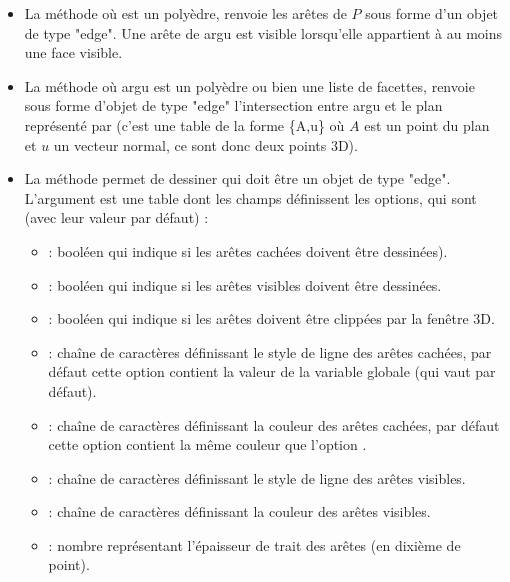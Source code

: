 \begin{itemize}
    \item La méthode  où  est un polyèdre, renvoie les arêtes de $P$ sous forme d'un objet de type "edge". Une arête de argu est visible lorsqu'elle appartient à au moins une face visible.
    
    \item La méthode  où argu est un polyèdre ou bien une liste de facettes, renvoie sous forme d'objet de type "edge" l'intersection entre argu et le plan représenté par  (c'est une table de la forme \{A,u\} où $A$ est un point du plan et $u$ un vecteur normal, ce sont donc deux points 3D).
    
    \item La méthode  permet de dessiner  qui doit être un objet de type "edge". L'argument  est une table dont les champs définissent les options, qui sont (avec leur valeur  par défaut) :
    \begin{itemize}
        \item {} : booléen qui indique si les arêtes cachées doivent être dessinées).
        \item {} : booléen qui indique si les arêtes visibles doivent être dessinées.
        \item {} : booléen qui indique si les arêtes doivent être clippées par la fenêtre 3D.
        \item {} : chaîne de caractères définissant le style de ligne des arêtes cachées, par défaut cette option contient la valeur de la variable globale  (qui vaut  par défaut).
        \item {} : chaîne de caractères définissant la couleur des arêtes cachées, par défaut cette option contient la même couleur que l'option .
        \item {} : chaîne de caractères définissant le style de ligne des arêtes visibles.
        \item {} : chaîne de caractères définissant la couleur des arêtes visibles.
        \item {} : nombre représentant l'épaisseur de trait des arêtes (en dixième de point).
    \end{itemize}


\end{itemize}
